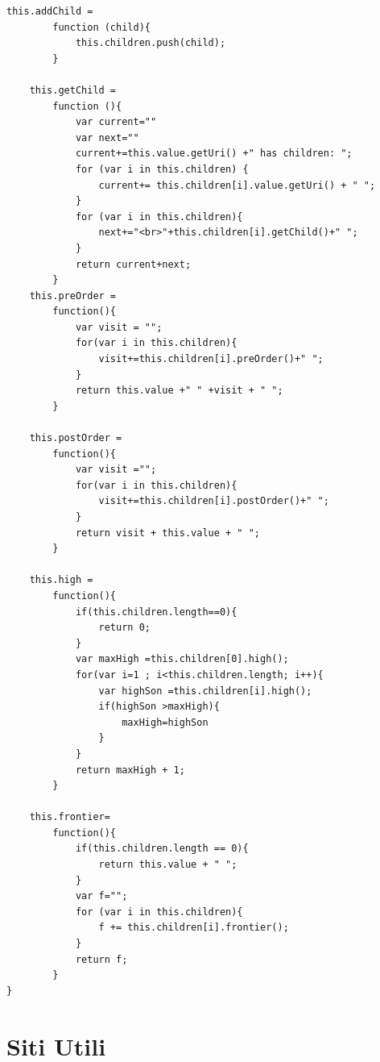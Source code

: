 \documentclass[a4paper,11pt]{article}
\begin{document}
\begin{lstlisting}[style=htmlcssjs]
	this.addChild =
		function (child){
			this.children.push(child);
		}
	
	this.getChild =
		function (){
			var current=""
			var next=""
			current+=this.value.getUri() +" has children: ";			
			for (var i in this.children) {
				current+= this.children[i].value.getUri() + " ";
			}
			for (var i in this.children){
				next+="<br>"+this.children[i].getChild()+" ";
			}
			return current+next;
		}
	this.preOrder =
		function(){
			var visit = "";
			for(var i in this.children){
				visit+=this.children[i].preOrder()+" ";
			}
			return this.value +" " +visit + " ";
		}

	this.postOrder =
		function(){
			var visit ="";
			for(var i in this.children){
				visit+=this.children[i].postOrder()+" ";
			}
			return visit + this.value + " ";
		}

	this.high =
		function(){
			if(this.children.length==0){
				return 0;
			}
			var maxHigh =this.children[0].high();
			for(var i=1 ; i<this.children.length; i++){
				var highSon =this.children[i].high();
				if(highSon >maxHigh){
					maxHigh=highSon
				}
			}
			return maxHigh + 1;
		}

	this.frontier=
		function(){
			if(this.children.length == 0){
				return this.value + " ";
			}
			var f="";
			for (var i in this.children){
				f += this.children[i].frontier();
			}
			return f;
		}
}
\end{lstlisting}
\newpage 


\appendix
\section{Siti Utili}
\end{document}
